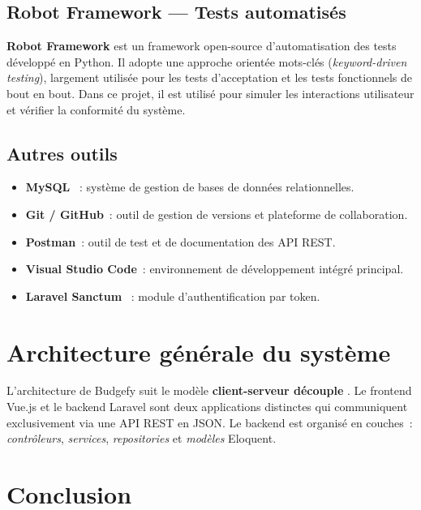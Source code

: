 \documentclass{rapportPFA}
\begin{document}
\subsection{Robot Framework --- Tests automatis\'es}

\textbf{Robot Framework} \cite{robot} est un framework open-source d'automatisation des
tests d\'evelopp\'e en Python. Il adopte une approche orient\'ee mots-cl\'es
(\textit{keyword-driven testing}), largement utilis\'ee pour les tests d'acceptation et
les tests fonctionnels de bout en bout. Dans ce projet, il est utilis\'e pour simuler
les interactions utilisateur et v\'erifier la conformit\'e du syst\`eme.

\subsection{Autres outils}

\begin{itemize}
    \item \textbf{MySQL} \cite{mysql}~: syst\`eme de gestion de bases de donn\'ees relationnelles.
    \item \textbf{Git / GitHub}~: outil de gestion de versions et plateforme de collaboration.
    \item \textbf{Postman}~: outil de test et de documentation des API REST.
    \item \textbf{Visual Studio Code}~: environnement de d\'eveloppement int\'egr\'e principal.
    \item \textbf{Laravel Sanctum} \cite{laravel-sanctum}~: module d'authentification par token.
\end{itemize}

\section{Architecture g\'en\'erale du syst\`eme}

L'architecture de Budgefy suit le mod\`ele \textbf{client-serveur d\'ecouple} \cite{restapi}.
Le frontend Vue.js et le backend Laravel sont deux applications distinctes qui communiquent
exclusivement via une API REST en JSON. Le backend est organis\'e en couches~:
\textit{contr\^oleurs}, \textit{services}, \textit{repositories} et \textit{mod\`eles} Eloquent.

\section{Conclusion}
\end{document}
